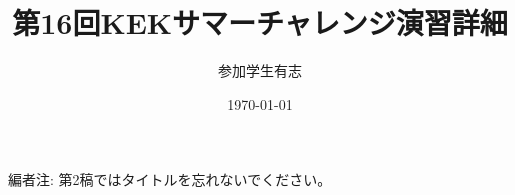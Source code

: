 \documentclass[dvipdfmx]{jsarticle}
\begin{document}
\title{第16回KEKサマーチャレンジ演習詳細}
\author{参加学生有志}
\date{\today}
\begin{titlepage}
    \maketitle
    \thispagestyle{empty}
\end{titlepage}


\pagebreak

編者注: 第2稿ではタイトルを忘れないでください。

\pagebreak



\end{document}

